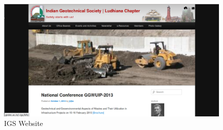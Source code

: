 \newpage
\begin{figure}[h]
\centering \includegraphics[scale=1.0]{igs.png}
\caption{IGS Website}
\end{figure}
 
